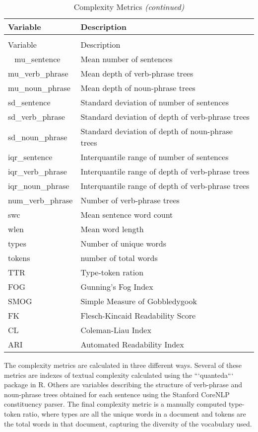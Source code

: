 \documentclass[../thesis.tex]{subfiles}
\begin{document}
\begin{longtable}[t]{ll}
\caption{\label{tab:}Complexity Metrics}\\
\toprule
Variable & Description\\
\midrule
\endfirsthead
\caption[]{Complexity Metrics \textit{(continued)}}\\
\toprule
Variable & Description\\
\midrule
\endhead
\
\endfoot
\bottomrule
\endlastfoot
mu\_sentence & Mean number of sentences\\
mu\_verb\_phrase & Mean depth of verb-phrase trees\\
mu\_noun\_phrase & Mean depth of noun-phrase trees\\
sd\_sentence & Standard deviation of number of sentences\\
sd\_verb\_phrase & Standard deviation of depth of verb-phrase trees\\
\addlinespace
sd\_noun\_phrase & Standard deviation of depth of noun-phrase trees\\
iqr\_sentence & Interquantile range of number of sentences\\
iqr\_verb\_phrase & Interquantile range of depth of verb-phrase trees\\
iqr\_noun\_phrase & Interquantile range of depth of verb-phrase trees\\
num\_verb\_phrase & Number of verb-phrase trees\\
\addlinespace
swc & Mean sentence word count\\
wlen & Mean word length\\
types & Number of unique words\\
tokens & number of total words\\
TTR & Type-token ration\\
\addlinespace
FOG & Gunning's Fog Index\\
SMOG & Simple Measure of Gobbledygook\\
FK & Flesch-Kincaid Readability Score\\
CL & Coleman-Liau Index\\
ARI & Automated Readability Index\\*
\end{longtable}

The complexity metrics are calculated in three different ways. Several of these metrics are indexes of textual complexity calculated using the ```quanteda``` package in R. Others are variables describing the structure of verb-phrase and noun-phrase trees obtained for each sentence using the Stanford CoreNLP constituency parser. The final complexity metric is a manually computed type-token ratio, where types are all the unique words in a document and tokens are the total words in that document, capturing the diversity of the vocabulary used.
\end{document}
